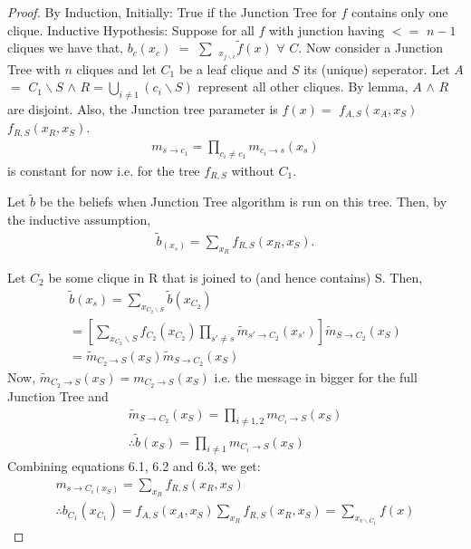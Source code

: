 \documentclass[12pt]{report}
\begin{document}
\begin{proof}
By Induction,\newline
Initially: True if the Junction Tree for $f$ contains only one clique.\newline
Inductive Hypothesis: Suppose for all $f$ with junction having $<=$ $n - 1$ cliques we have that, $b_{c}(x_{c})$ $=$ $\sum$ ${_{x_{j\backslash c}}}\tilde{f}(x)$ $\forall$ $C$. Now consider a Junction Tree with $n$ cliques and let $C_{1}$ be a leaf clique and $S$ its (unique) seperator.  Let $A$ $=$ $C_{1}\backslash S$ $\land$ $R = \bigcup _{i \neq 1} (c_{i} \backslash S)$ represent all other cliques. By lemma, $A$ $\land$ $R$ are disjoint. Also, the Junction tree parameter is $f(x) = $ $f_{A,S}(x_{A}, x_{S})$ $f_{R, S}(x_{R}, x_{S})$. 
\begin{eqnarray}
m_{s\rightarrow c_{1}} = \prod _{c_{i}\neq c_{1}} m_{c_{i} \rightarrow s}(x_{s})
\end{eqnarray}
is constant for now i.e. for the tree $f_{R,S}$ without $C_{1}$. %

Let $\tilde{b}$ be the beliefs when Junction Tree algorithm is run on this tree. Then, by the inductive assumption, 
\begin{eqnarray}
\tilde{b} _{(x_{s})} = \sum _{x_{R}} f _{R,S} (x_{R}, x_{S}). 
\end{eqnarray}

Let $C_{2}$ be some clique in R that is joined to (and hence contains) S. Then,
\begin{eqnarray*}
\tilde{b}(x_{s}) = \sum _{x_{C_{2}\backslash S}} \tilde{b}(x_{C_{2}}) \nonumber\\%
= [\sum _{x_{C_{2}}\backslash S} f_{C_{2}}(x_{C_{2}}) \prod _{s' \neq s} \tilde{m} _{s'\rightarrow C_{2}} (x_{s'})] \tilde{m}_{S\rightarrow C_{2}}(x_{S}) \nonumber\\%
= \tilde{m} _{C_{2} \rightarrow S} (x_{S}) \tilde{m} _{S \rightarrow C_{2}} (x_{S}) \nonumber%
\end{eqnarray*}
Now, $\tilde{m} _{C_{2} \rightarrow S}(x_{S}) = m _{C_{2} \rightarrow S}(x_{S})$ i.e. the message in bigger for the full Junction Tree and 
\begin{eqnarray}
\tilde{m} _{S \rightarrow C_{2}} (x_{S}) = \prod _{i \neq 1,2} m _{C_{i} \rightarrow S} (x_{S}) \nonumber\\
\therefore  \tilde{b} (x_{S}) = \prod _{i \neq 1} m _{C_{i} \rightarrow S} (x_{S}) 
\end{eqnarray}
Combining equations 6.1, 6.2 and 6.3, we get:
\begin{eqnarray*}
m_{s\rightarrow C_{i}(x_{S})} = \sum _{x_{R}} f_{R, S} (x_{R}, x_{S})\\
\therefore b_{C_{1}} (x_{C_{1}}) = f _{A,S}(x_{A}, x_{S}) \sum _{x_{R}} f_{R,S}(x_{R},x_{S}) = \sum _{x_{v \backslash C_{1}}} f(x)
\end{eqnarray*}
\end{proof}
\end{document}
